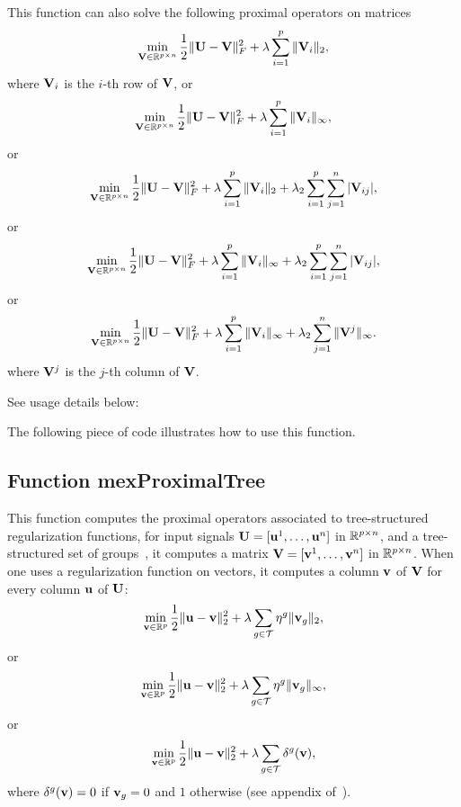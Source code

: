 \documentclass[a4paper, 11pt]{article}
\begin{document}
This function can also solve the following proximal operators on matrices
\begin{equation}
\min_{{\mathbf V} \in {\mathbb R}^{p \times n}} \frac{1}{2}\|{\mathbf U}-{\mathbf V}\|_F^2 + \lambda \sum_{i=1}^p \|{\mathbf V}_i\|_2, 
\end{equation}
where ${\mathbf V}_i$ is the $i$-th row of ${\mathbf V}$, or
\begin{equation}
\min_{{\mathbf V} \in {\mathbb R}^{p \times n}} \frac{1}{2}\|{\mathbf U}-{\mathbf V}\|_F^2 + \lambda \sum_{i=1}^p \|{\mathbf V}_i\|_\infty, 
\end{equation}
or
\begin{equation}
\min_{{\mathbf V} \in {\mathbb R}^{p \times n}} \frac{1}{2}\|{\mathbf U}-{\mathbf V}\|_F^2 + \lambda \sum_{i=1}^p \|{\mathbf V}_i\|_2 +\lambda_2 \sum_{i=1}^p\sum_{j=1}^n |{\mathbf V}_{ij}|, 
\end{equation}
or
\begin{equation}
\min_{{\mathbf V} \in {\mathbb R}^{p \times n}} \frac{1}{2}\|{\mathbf U}-{\mathbf V}\|_F^2 + \lambda \sum_{i=1}^p \|{\mathbf V}_i\|_\infty +\lambda_2 \sum_{i=1}^p\sum_{j=1}^n |{\mathbf V}_{ij}|, 
\end{equation}
or
\begin{equation}
\min_{{\mathbf V} \in {\mathbb R}^{p \times n}} \frac{1}{2}\|{\mathbf U}-{\mathbf V}\|_F^2 + \lambda \sum_{i=1}^p \|{\mathbf V}_i\|_\infty +\lambda_2 \sum_{j=1}^n \|{\mathbf V}^j\|_\infty.
\end{equation}
where ${\mathbf V}^j$ is the $j$-th column of ${\mathbf V}$.

   See usage details below:
%    

The following piece of code illustrates how to use this function.


\subsection{Function mexProximalTree}
This function computes the proximal operators associated to tree-structured regularization functions, for input signals ${\mathbf U}=[{\mathbf u}^1,\ldots,{\mathbf u}^n]$ in ${\mathbb R}^{p \times n}$, and a tree-structured set of groups~\cite{jenatton3}, it computes a matrix ${\mathbf V}=[{\mathbf v}^1,\ldots,{\mathbf v}^n]$ in ${\mathbb R}^{p \times n}$. When one uses a regularization function on vectors, it computes a column ${\mathbf v}$ of ${\mathbf V}$ for every column ${\mathbf u}$ of ${\mathbf U}$:
\begin{equation}
\min_{{\mathbf v} \in {\mathbb R}^p} \frac{1}{2}\|{\mathbf u}-{\mathbf v}\|_2^2 + \lambda \sum_{g \in {\mathcal T}} \eta^g \|{\mathbf v}_g\|_2,
   \end{equation}
   or
   \begin{equation}
   \min_{{\mathbf v} \in {\mathbb R}^p} \frac{1}{2}\|{\mathbf u}-{\mathbf v}\|_2^2 + \lambda \sum_{g \in {\mathcal T}} \eta^g \|{\mathbf v}_g\|_\infty,
   \end{equation}
   or
   \begin{equation}
   \min_{{\mathbf v} \in {\mathbb R}^p} \frac{1}{2}\|{\mathbf u}-{\mathbf v}\|_2^2 + \lambda \sum_{g \in {\mathcal T}} \delta^g({\mathbf v}),
   \end{equation}
   where $\delta^g({\mathbf v})=0$ if ${\mathbf v}_g=0$ and $1$ otherwise (see appendix of~\cite{jenatton4}).
\end{document}

